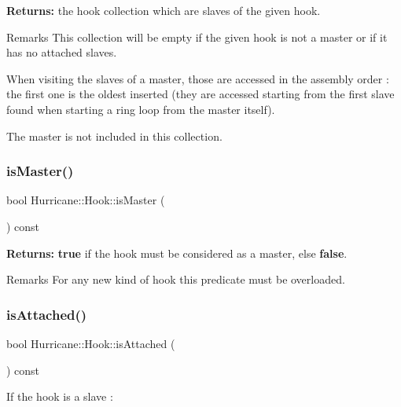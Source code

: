 {\bfseries Returns\+:} the hook collection which are slaves of the given hook.

\begin{DoxyRemark}{Remarks}
This collection will be empty if the given hook is not a master or if it has no attached slaves.
\end{DoxyRemark}
When visiting the slaves of a master, those are accessed in the assembly order \+: the first one is the oldest inserted (they are accessed starting from the first slave found when starting a ring loop from the master itself).

The master is not included in this collection. \mbox{\label{classHurricane_1_1Hook_af0940eb0761f05df0b82c4198e22a01c}} 
\subsubsection{\texorpdfstring{is\+Master()}{isMaster()}}
{\footnotesize\ttfamily bool Hurricane\+::\+Hook\+::is\+Master (\begin{DoxyParamCaption}{ }\end{DoxyParamCaption}) const\hspace{0.3cm}{\ttfamily [pure virtual]}}

{\bfseries Returns\+:} {\bfseries true} if the hook must be considered as a master, else {\bfseries false}.

\begin{DoxyRemark}{Remarks}
For any new kind of hook this predicate must be overloaded. 
\end{DoxyRemark}
\mbox{\label{classHurricane_1_1Hook_acd62c7de2c023a1013d5a728159d068d}} 
\subsubsection{\texorpdfstring{is\+Attached()}{isAttached()}}
{\footnotesize\ttfamily bool Hurricane\+::\+Hook\+::is\+Attached (\begin{DoxyParamCaption}{ }\end{DoxyParamCaption}) const}

If the hook is a slave \+:

